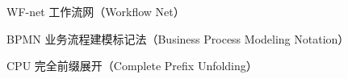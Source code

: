 \begin{denotation}[3cm]
\item[WF-net] 工作流网（Workflow Net）
\item[BPMN] 业务流程建模标记法（Business Process Modeling Notation）
\item[CPU] 完全前缀展开（Complete Prefix Unfolding）
\end{denotation}
